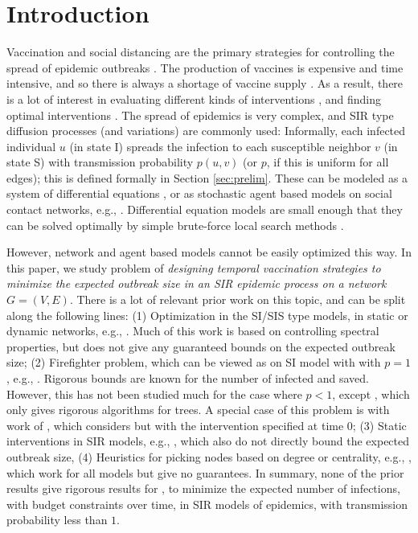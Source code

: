 \section{Introduction}
\label{sec:intro}

Vaccination and social distancing are the primary strategies for controlling the spread of epidemic outbreaks
\cite{medlock:science09,Ogura2017,halloran:pnas08,lofgren:pnas14,zhang2015controlling,YaoSDM2014,AAAI1816714,PreciadoVM13_2,PreciadoVM13,PreciadoVM14,Aspnes:2005}.
The production of vaccines is expensive and time intensive, and so there is always a shortage of
vaccine supply \cite{cdc:temporal}. As a result, there is a lot of interest in evaluating different kinds of
interventions \cite{halloran:pnas08,lofgren:pnas14}, and finding optimal interventions \cite{medlock:science09}.
The spread of epidemics is very complex, and SIR type diffusion processes (and variations) are commonly used:
Informally, each infected individual $u$ (in state I) spreads the infection to each susceptible neighbor $v$ 
(in state S) with transmission probability $p(u, v)$ (or $p$, if this is uniform for all edges); 
this is defined formally in Section \ref{sec:prelim}.
These can be modeled as a system of differential equations \cite{medlock:science09,AAAI1816714,venkataramanan:ichi17}, or as stochastic
agent based models on social contact networks, e.g., \cite{marathe:cacm13}.
Differential equation models are small enough that they can be solved optimally by simple brute-force
local search methods \cite{medlock:science09}.

However, network and agent based models cannot be easily optimized this way. 
In this paper, we study problem \prob{} of \emph{designing temporal vaccination strategies to minimize
the expected outbreak size in an SIR epidemic process on a network $G=(V, E)$}.
There is a lot of relevant prior work on this topic, and can be split along the following lines:
(1) Optimization in the SI/SIS type models, in static or dynamic networks, e.g.,
\cite{PreciadoVM13_2,PreciadoVM13,PreciadoVM14,SahaSDM15,Ogura2017}. Much of this work is based on
controlling spectral properties, but does not give any guaranteed bounds on the expected outbreak size;
(2) Firefighter problem, which can be viewed as \prob{} on SI model with with $p=1$, e.g.,
\cite{anshelevich09,Finbow2009TheFP}. Rigorous bounds are known for the number of infected and saved.
However, this has not been studied much for the case where $p<1$, except \cite{DBLP:journals/corr/abs-1711-08237},
which only gives rigorous algorithms for trees.
A special case of this problem is with work of \cite{Aspnes:2005}, which considers \prob{} but with
the intervention specified at time 0;
(3) Static interventions in SIR models, e.g., \cite{zhang2015controlling,YaoSDM2014}, which also do not
directly bound the expected outbreak size,
(4) Heuristics for picking nodes based on degree or centrality, e.g., \cite{PhysRevLett.91.247901,Miller2007EffectiveVS},
which work for all models but give no guarantees.
In summary, none of the prior results give rigorous results for \prob{}, to minimize the expected
number of infections, with budget constraints over time, in SIR models of epidemics, with transmission probability less than $1$.

